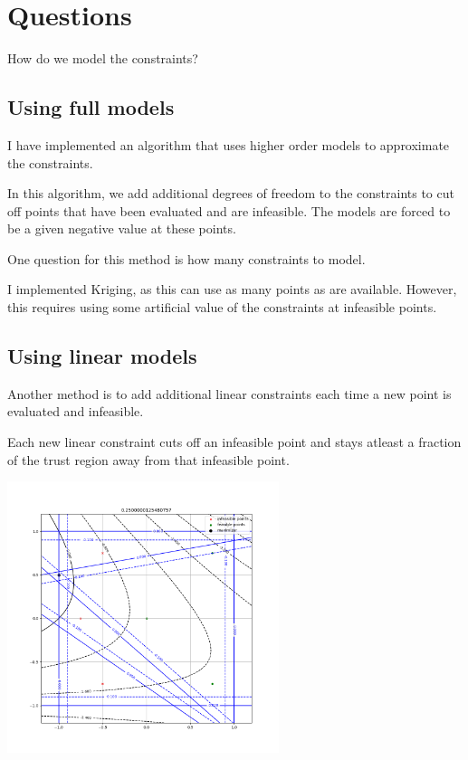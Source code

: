 


\section{Questions}

How do we model the constraints?

\subsection{Using full models}
I have implemented an algorithm that uses higher order models to approximate the constraints.

In this algorithm, we add additional degrees of freedom to the constraints to cut off points that have been evaluated and are infeasible.
The models are forced to be a given negative value at these points.

One question for this method is how many constraints to model.


I implemented Kriging, as this can use as many points as are available.
However, this requires using some artificial value of the constraints at infeasible points.

\subsection{Using linear models}

Another method is to add additional linear constraints each time a new point is evaluated and infeasible.

Each new linear constraint cuts off an infeasible point and stays atleast a fraction of the trust region away from that infeasible point.


\includegraphics[width=300px]{images/pyomo_cut_solution.png}

